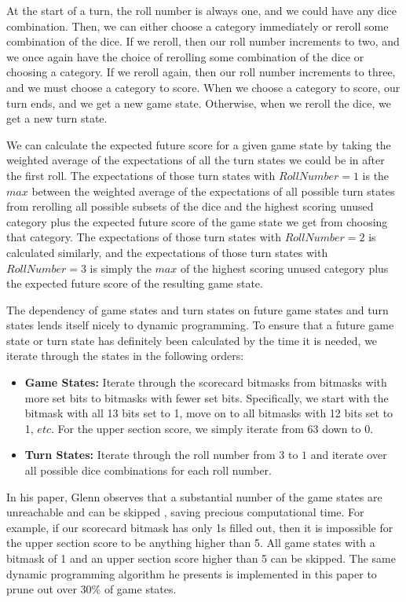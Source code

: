 \documentclass[12pt]{article}
\begin{document}
\noindent
At the start of a turn, the roll number is always one, and we could have any dice combination. Then, we can either choose a category immediately or reroll some combination of the dice. If we reroll, then our roll number increments to two, and we once again have the choice of rerolling some combination of the dice or choosing a category. If we reroll again, then our roll number increments to three, and we must choose a category to score. When we choose a category to score, our turn ends, and we get a new game state. Otherwise, when we reroll the dice, we get a new turn state.

We can calculate the expected future score for a given game state by taking the weighted average of the expectations of all the turn states we could be in after the first roll. The expectations of those turn states with $Roll Number = 1$ is the $max$ between the weighted average of the expectations of all possible turn states from rerolling all possible subsets of the dice and the highest scoring unused category plus the expected future score of the game state we get from choosing that category. The expectations of those turn states with $Roll Number = 2$ is calculated similarly, and the expectations of those turn states with $Roll Number = 3$ is simply the $max$ of the highest scoring unused category plus the expected future score of the resulting game state.

The dependency of game states and turn states on future game states and turn states lends itself nicely to dynamic programming. To ensure that a future game state or turn state has definitely been calculated by the time it is needed, we iterate through the states in the following orders:

\begin{itemize}
    \item \textbf{Game States:} Iterate through the scorecard bitmasks from bitmasks with more set bits to bitmasks with fewer set bits. Specifically, we start with the bitmask with all 13 bits set to 1, move on to all bitmasks with 12 bits set to 1, $etc.$ For the upper section score, we simply iterate from 63 down to 0. 
    \item \textbf{Turn States:} Iterate through the roll number from $3$ to $1$ and iterate over all possible dice combinations for each roll number.
\end{itemize}

\noindent
In his paper, Glenn observes that a substantial number of the game states are unreachable and can be skipped \cite{glenn}, saving precious computational time. For example, if our scorecard bitmask has only 1s filled out, then it is impossible for the upper section score to be anything higher than 5. All game states with a bitmask of 1 and an upper section score higher than 5 can be skipped. The same dynamic programming algorithm he presents is implemented in this paper to prune out over 30\% of game states.
\end{document}
